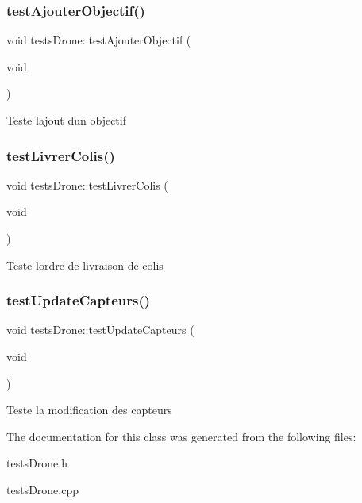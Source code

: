 \subsubsection{\texorpdfstring{test\+Ajouter\+Objectif()}{testAjouterObjectif()}}
{\footnotesize\ttfamily void tests\+Drone\+::test\+Ajouter\+Objectif (\begin{DoxyParamCaption}\item[{void}]{ }\end{DoxyParamCaption})\hspace{0.3cm}{\ttfamily [protected]}}

Teste l\textquotesingle{}ajout d\textquotesingle{}un objectif \mbox{\label{classtests_drone_a61a34f9f1218e7b9fda75901a152208d}} 
\subsubsection{\texorpdfstring{test\+Livrer\+Colis()}{testLivrerColis()}}
{\footnotesize\ttfamily void tests\+Drone\+::test\+Livrer\+Colis (\begin{DoxyParamCaption}\item[{void}]{ }\end{DoxyParamCaption})\hspace{0.3cm}{\ttfamily [protected]}}

Teste l\textquotesingle{}ordre de livraison de colis \mbox{\label{classtests_drone_a7e7114974f0c5d91f09b147277732bf3}} 
\subsubsection{\texorpdfstring{test\+Update\+Capteurs()}{testUpdateCapteurs()}}
{\footnotesize\ttfamily void tests\+Drone\+::test\+Update\+Capteurs (\begin{DoxyParamCaption}\item[{void}]{ }\end{DoxyParamCaption})\hspace{0.3cm}{\ttfamily [protected]}}

Teste la modification des capteurs 

The documentation for this class was generated from the following files\+:\begin{DoxyCompactItemize}
\item 
tests\+Drone.\+h\item 
tests\+Drone.\+cpp\end{DoxyCompactItemize}
